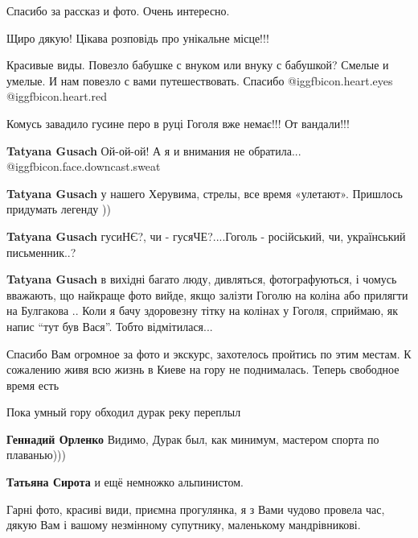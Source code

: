 \begin{itemize}
Спасибо за рассказ и фото. Очень интересно.

Щиро дякую! Цікава розповідь про унікальне місце!!!


Красивые виды. Повезло бабушке с внуком или внуку с бабушкой? Смелые и умелые.
И нам повезло с вами путешествовать.  Спасибо @igg{fbicon.heart.eyes}
@igg{fbicon.heart.red}

Комусь завадило гусине перо в руці Гоголя вже немає!!! От вандали!!!

\begin{itemize} %
\textbf{Tatyana Gusach} Ой-ой-ой!
А я и внимания не обратила... @igg{fbicon.face.downcast.sweat} 

\textbf{Tatyana Gusach} у нашего Херувима, стрелы, все время «улетают».
Пришлось придумать легенду ))

\textbf{Tatyana Gusach} гусиНЄ?, чи - гусяЧЕ?....Гоголь - російський, чи, український письменник..?

\textbf{Tatyana Gusach} в вихідні багато люду, дивляться, фотографуються, і чомусь вважають, що найкраще фото вийде, якщо залізти Гоголю на коліна або прилягти на Булгакова .. Коли я бачу здоровезну тітку на колінах у Гоголя, сприймаю, як напис \enquote{тут був Вася}. Тобто відмітилася...
\end{itemize} %


Спасибо Вам огромное за фото и экскурс, захотелось пройтись по этим местам. К
сожалению живя всю жизнь в Киеве на гору не поднималась. Теперь свободное время
есть

Пока умный гору обходил дурак реку переплыл

\begin{itemize} %
\textbf{Геннадий Орленко} Видимо, Дурак был, как минимум, мастером спорта по плаванью)))

\textbf{Татьяна Сирота} и ещё немножко альпинистом.
\end{itemize} %


Гарні фото, красиві види, приємна прогулянка, я з Вами чудово провела час,
дякую Вам і вашому незмінному супутнику, маленькому мандрівникові.



\end{itemize}
